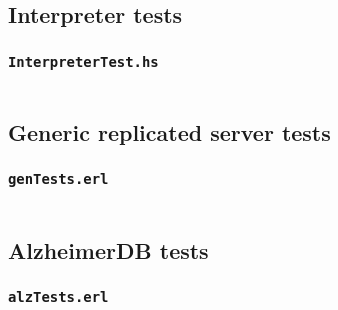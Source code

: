 \documentclass[a4paper]{article}
\begin{document}
\subsection{Interpreter tests}
\label{Interpretertests}
\subsubsection{\texttt{InterpreterTest.hs}}
\label{intUnit}
\inputminted{haskell}{../src/subs/InterpreterTest.hs}
\subsection{Generic replicated server tests}
\label{ssub:Generic replicated server tests}
\subsubsection{\texttt{genTests.erl}}
\label{gentest}
\inputminted{erlang}{../src/alzheimer/genTests.erl}
\subsection{AlzheimerDB tests}
\label{sub:AlzheimerDB tests}
\subsubsection{\texttt{alzTests.erl}}
\label{alztest}
\inputminted{erlang}{../src/alzheimer/alzTests.erl}
\end{document}
